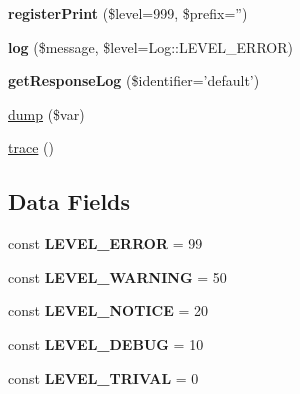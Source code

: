 \begin{DoxyCompactItemize}
\item 
\hypertarget{class_utopia_1_1_components_1_1_logger_1_1_log_a2372e8fa616466a708d799f34f369b62}{
{\bfseries registerPrint} (\$level=999, \$prefix='')}
\label{class_utopia_1_1_components_1_1_logger_1_1_log_a2372e8fa616466a708d799f34f369b62}

\item 
\hypertarget{class_utopia_1_1_components_1_1_logger_1_1_log_a7cb8a5544724454f18a03cc2baffb2f7}{
{\bfseries log} (\$message, \$level=Log::LEVEL\_\-ERROR)}
\label{class_utopia_1_1_components_1_1_logger_1_1_log_a7cb8a5544724454f18a03cc2baffb2f7}

\item 
\hypertarget{class_utopia_1_1_components_1_1_logger_1_1_log_a26639439cfb18bbef8971f95f8956827}{
{\bfseries getResponseLog} (\$identifier='default')}
\label{class_utopia_1_1_components_1_1_logger_1_1_log_a26639439cfb18bbef8971f95f8956827}

\item 
\hyperlink{class_utopia_1_1_components_1_1_logger_1_1_log_a895e5722800766a91bf27c9b5e2cc579}{dump} (\$var)
\item 
\hyperlink{class_utopia_1_1_components_1_1_logger_1_1_log_adf6e151f76b1209e675d2f0e7c506397}{trace} ()
\end{DoxyCompactItemize}
\subsection*{Data Fields}
\begin{DoxyCompactItemize}
\item 
\hypertarget{class_utopia_1_1_components_1_1_logger_1_1_log_a31a68e08704b95f676ca98e296f82533}{
const {\bfseries LEVEL\_\-ERROR} = 99}
\label{class_utopia_1_1_components_1_1_logger_1_1_log_a31a68e08704b95f676ca98e296f82533}

\item 
\hypertarget{class_utopia_1_1_components_1_1_logger_1_1_log_a2476288171fae603f5232088e70f0b75}{
const {\bfseries LEVEL\_\-WARNING} = 50}
\label{class_utopia_1_1_components_1_1_logger_1_1_log_a2476288171fae603f5232088e70f0b75}

\item 
\hypertarget{class_utopia_1_1_components_1_1_logger_1_1_log_ae3ce161701b7251a25fbab6231dda0d4}{
const {\bfseries LEVEL\_\-NOTICE} = 20}
\label{class_utopia_1_1_components_1_1_logger_1_1_log_ae3ce161701b7251a25fbab6231dda0d4}

\item 
\hypertarget{class_utopia_1_1_components_1_1_logger_1_1_log_a238eab83d6b968bf411000e504ca5aed}{
const {\bfseries LEVEL\_\-DEBUG} = 10}
\label{class_utopia_1_1_components_1_1_logger_1_1_log_a238eab83d6b968bf411000e504ca5aed}

\item 
\hypertarget{class_utopia_1_1_components_1_1_logger_1_1_log_a3a92daec9672375c7935ebb86f9a5951}{
const {\bfseries LEVEL\_\-TRIVAL} = 0}
\label{class_utopia_1_1_components_1_1_logger_1_1_log_a3a92daec9672375c7935ebb86f9a5951}

\end{DoxyCompactItemize}


